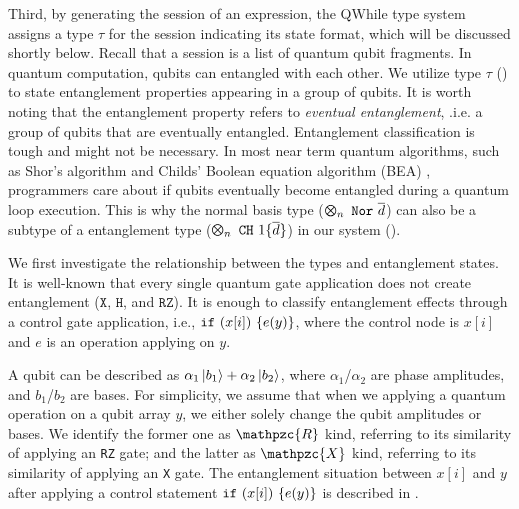Third, by generating the session of an expression, the QWhile type system assigns a type $\tau$ for the session indicating its state format, which will be discussed shortly below. Recall that a session is a list of quantum qubit fragments.
In quantum computation, qubits can entangled with each other.
We utilize type $\tau$ () to state entanglement properties appearing in a group of qubits.
It is worth noting that the entanglement property refers to \textit{eventual entanglement}, .i.e. a group of qubits that are eventually entangled. Entanglement classification is tough and might not be necessary. In most near term quantum algorithms, such as Shor's algorithm \cite{shors} and Childs' Boolean equation algorithm (BEA) \cite{ChildsNAND}, programmers care about if qubits eventually become entangled during a quantum loop execution. This is why the normal basis type ($\ttype{n}{\tnor{\overline{d}}}$) can also be a subtype of a entanglement type ($\ttype{n}{\tch{1}{\{\overline{d}\}}}$) in our system ().

We first investigate the relationship between the types and entanglement states.
It is well-known that every single quantum gate application
does not create entanglement ($\texttt{X}$, $\texttt{H}$, and $\texttt{RZ}$).
It is enough to classify entanglement effects through a control gate application, i.e., 
$\texttt{if}~{(x[i])}~{\{e(y)\}}$, where the control node is $x[i]$ and $e$ is an operation applying on $y$.

A qubit can be described as $\alpha_1\left\vert{b_1}\right\rangle+\alpha_2\left\vert{b_2}\right\rangle$,
where $\alpha_1$/$\alpha_2$ are phase amplitudes, and $b_1$/$b_2$ are bases.
For simplicity, we assume that
when we applying a quantum operation on a qubit array $y$, we either solely change the qubit amplitudes or bases.
We identify the former one as $\mathpzc{R}$ kind, referring to its similarity of applying an \texttt{RZ} gate;
and the latter as $\mathpzc{X}$ kind, referring to its similarity of applying an \texttt{X} gate.
The entanglement situation between $x[i]$ and $y$ after applying a control statement $\texttt{if}~{(x[i])}~{\{e(y)\}}$ is described in .

